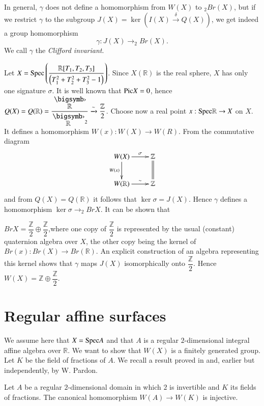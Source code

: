 In general, $\gamma$ does not define a homomorphism from $W(X)$ to $_2Br(X)$, but if we restrict $\gamma$ to the subgroup $J(X)=\ker (I(X)\xrightarrow{\delta}Q(X))$, we get indeed a group homomorphism 
$$
\gamma:J(X)\to_2Br(X).
$$
We call $\gamma$ the \textit{Clifford invariant}.

\begin{EXP}
Let $X=\mathrm{Spec}\left(\dfrac{\mathbb{R}[T_1,T_2,T_3]}{\left(T^{2}_1+T^{2}_2+T^{2}_3-1\right)}\right)$. Since $X(\mathbb{R})$ is the real sphere, $X$ has only one signature $\sigma$. It is well known that $\mathrm{Pic} X=0$, hence $Q(X)=Q(\mathbb{R})=\dfrac{\overdot{\mathbb{R}}}{\overdot{\mathbb{R}}{}^{2}}\xrightarrow{\sim} \dfrac{\mathbb{Z}}{2}$. Choose now a real point $x: \mathrm{Spec} \mathbb{R}\to X$ on $X$. It defines a homomorphism $W(x):W(X)\to W(R)$. From the commutative diagram
$$
\xymatrix{W(X)\ar[r]^-{\sigma}\ar[d]_{W(x)}&\mathbb{Z}\ar@{=}[d]\\
W(\mathbb{R})\ar[r]^-{\sim}&\mathbb{Z}}
$$
and from $Q(X)=Q(\mathbb{R})$ it follows that $\ker \sigma =J(X)$. Hence $\gamma$ defines a homomorphism $\ker \sigma\to_2Br X$. It can be shown that 
\end{EXP}

$Br X=\dfrac{\mathbb{Z}}{2}\oplus \dfrac{\mathbb{Z}}{2}$,\pageoriginale where one copy of $\dfrac{\mathbb{Z}}{2}$ is represented by the usual (constant) quaternion algebra over $X$, the other copy being the kernel of $Br(x):Br(X)\to Br(\mathbb{R})$. An explicit construction of an algebra representing this kernel shows that $\gamma$ maps $J(X)$ isomorphically onto $\dfrac{\mathbb{Z}}{2}$. Hence $W(X)=\mathbb{Z}\oplus \dfrac{\mathbb{Z}}{2}$. 

\section{Regular affine surfaces}\label{s3}

We assume here that $X=\mathrm{Spec} A$ and that $A$ is a regular $2$-dimensional integral affine algebra over $\mathbb{R}$. We want to show that $W(X)$ is a finitely generated group. Let $K$ be the field of fractions of $A$. We recall a result proved in \cite{key13} and, earlier but \cite{key4} independently, by W. Pardon. 

\begin{thm}\label{thm1}
Let $A$ be a regular $2$-dimensional domain in which $2$ is invertible and $K$ its fields of fractions. The canonical homomorphism $W(A)\to W(K)$ is injective.
\end{thm}


